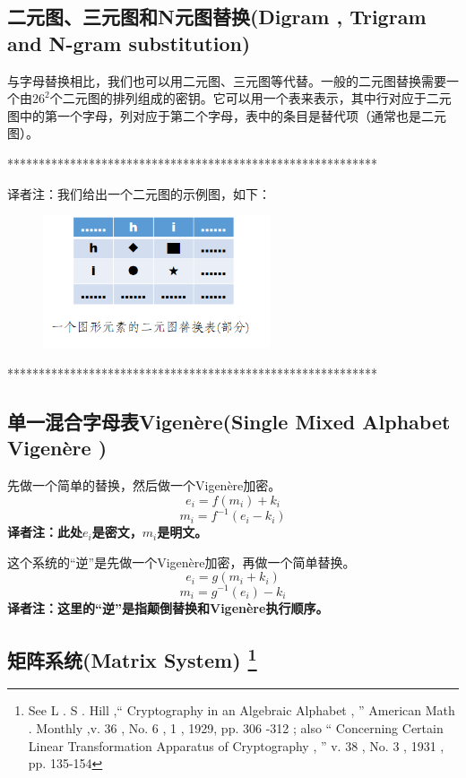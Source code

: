 \documentclass[]{article}
\begin{document}
\subsection{二元图、三元图和N元图替换(Digram , Trigram and N-gram substitution)}

与字母替换相比，我们也可以用二元图、三元图等代替。一般的二元图替换需要一个由$26^2$个二元图的排列组成的密钥。它可以用一个表来表示，其中行对应于二元图中的第一个字母，列对应于第二个字母，表中的条目是替代项（通常也是二元图）。
\par
\vspace{1cm}
***********************************************************\par
译者注：我们给出一个二元图的示例图，如下：\par
\begin{figure}[htb]
	\includegraphics[width=0.6\textwidth]{diagram-example.png}
\end{figure}
\par
***********************************************************\par
\vspace{1cm}

\subsection{单一混合字母表Vigen\`{e}re(Single Mixed Alphabet Vigen\`{e}re )}
先做一个简单的替换，然后做一个Vigen\`{e}re加密。
\[e_i=f(m_i)+k_i\]
\[m_i=f^{-1}(e_i-k_i)\]
\textbf{译者注：此处$e_i$是密文，$m_i$是明文。}
\par

这个系统的“逆”是先做一个Vigen\`{e}re加密，再做一个简单替换。
\[e_i=g(m_i+k_i)\]
\[m_i=g^{-1}(e_i)-k_i\]
\textbf{译者注：这里的“逆”是指颠倒替换和Vigen\`{e}re执行顺序。}\par


\subsection{矩阵系统(Matrix System) \protect\footnote{See L . S . Hill ,“ Cryptography in an Algebraic Alphabet , ” American Math . Monthly ,v. 36 , No. 6 , 1 , 1929, pp. 306 -312 ; also “ Concerning Certain Linear Transformation Apparatus of Cryptography , ” v. 38 , No. 3 , 1931 , pp. 135-154 } }
\end{document}
